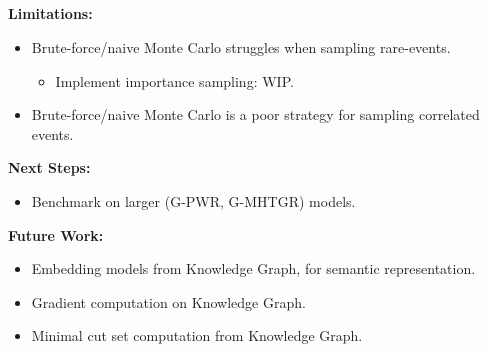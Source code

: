 \subsection{}
\begin{frame}
  \textbf{Limitations:}
  \begin{itemize}
      \item {Brute-force/naive Monte Carlo struggles when sampling rare-events.}
        \begin{itemize}
          \item{Implement importance sampling: WIP.}
        \end{itemize}
      \item {Brute-force/naive Monte Carlo is a poor strategy for sampling correlated events.}
  \end{itemize}\par
  \vfill
  \textbf{Next Steps:}
  \begin{itemize}
      \item {Benchmark on larger (G-PWR, G-MHTGR) models.}
  \end{itemize}\par
  \vfill
  \textbf{Future Work:}
  \begin{itemize}
      \item {Embedding models from Knowledge Graph, for semantic representation.}
      \item {Gradient computation on Knowledge Graph.}
      \item {Minimal cut set computation from Knowledge Graph.}
  \end{itemize}\par
\end{frame}